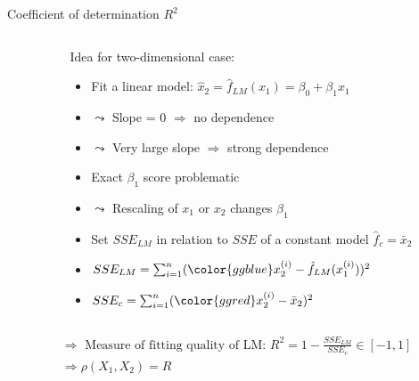 \documentclass[11pt,compress,t,notes=noshow, aspectratio=169, xcolor=table]{beamer}
\begin{document}
\begin{frame}{Coefficient of determination $R^2$}
\begin{columns}[c, totalwidth=\textwidth]
\begin{column}{0.5\linewidth}
\end{column}
\begin{column}{0.5\linewidth}

\medskip

Idea for two-dimensional case:
\begin{itemize}
    \setlength\itemsep{0.7mm}
    \item Fit a linear model:
    $\hat{x}_2 = \hat{f}_{LM}(x_1) = \beta_0 + \beta_1 x_1$
    \item[] $\leadsto$ Slope = $0$ $\Rightarrow$ no dependence
    \item[] $\leadsto$ Very large slope $\Rightarrow$ strong dependence
    \item Exact $\beta_1$ score problematic 
    \pause
    \item[] $\leadsto$ Rescaling of $x_1$ or $x_2$ changes $\beta_1$ 
    \pause
    \item Set $SSE_{LM}$ in relation to $SSE$ of a constant model $\hat{f}_c = \bar{x}_2$
    \item[] $SSE_{LM} = \sum_{i=1}^n ({\color{ggblue}x_2^{(i)} - \hat{f}_{LM}(x_1^{(i)})})^2$
    \item[] $SSE_{c} = \sum_{i=1}^n ({\color{ggred}x_2^{(i)} - \bar{x}_2})^2$
\end{itemize}

\end{column}
\end{columns}

\begin{align*}
    &\Rightarrow \text{ Measure of fitting quality of LM: } R^2 = 1-\frac{SSE_{LM}}{SSE_{c}} \in [-1, 1] \\
    &\Rightarrow \rho(X_1, X_2) = R
\end{align*}

\end{frame}
\end{document}
